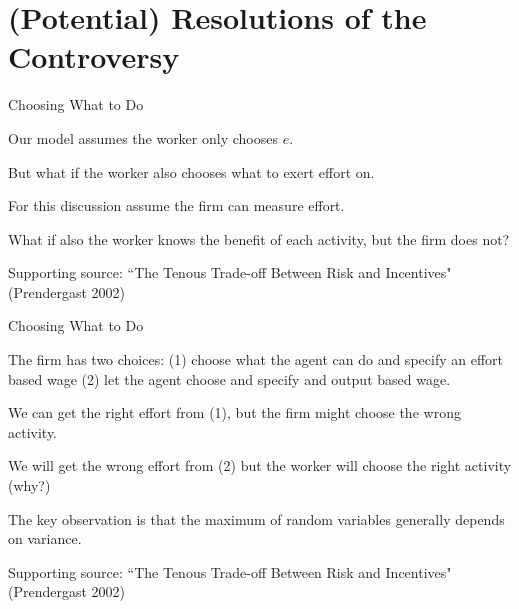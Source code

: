 \documentclass[aspectratio=169,usenames,dvipsnames]{beamer}
\newenvironment{wideitemize}{\itemize\addtolength{\itemsep}{10pt}}{\enditemize}
\begin{document}
\section{(Potential) Resolutions of the Controversy}


\begin{frame}{Choosing What to Do}

\begin{wideitemize}
    \item Our model assumes the worker only chooses $e$.
    \item But what if the worker also chooses what to exert effort on.
    \item For this discussion assume the firm can measure effort.
    \item What if also the worker knows the benefit of each activity, but the firm does not?
\end{wideitemize}



\small Supporting source: ``The Tenous Trade-off Between Risk and Incentives" (Prendergast 2002)

    
\end{frame}


\begin{frame}{Choosing What to Do}

\begin{wideitemize}
    \item The firm has two choices: (1) choose what the agent can do and specify an effort based wage (2) let the agent choose and specify and output based wage.
    \item We can get the right effort from (1), but the firm might choose the wrong  activity.
    \item We will get the wrong effort from (2) but the worker will choose the right activity (why?)
    \item The key observation is that the maximum of random variables generally depends on variance.
\end{wideitemize}

\small Supporting source: ``The Tenous Trade-off Between Risk and Incentives" (Prendergast 2002)

    
\end{frame}
\end{document}
